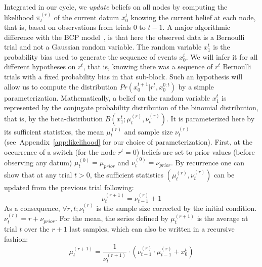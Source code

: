 \documentclass[12pt,english]{article}%
\newcommand{\eql}[1]{\begin{equation}#1\end{equation}}
\newcommand{\citep}[1]{\parencite{#1}}
\newcommand{\seeFig}[1]{Figure~\ref{fig:#1}}
\newcommand{\seeEq}[1]{Equation~\ref{eq:#1}}
\newcommand{\seeApp}[1]{Appendix~\ref{app:#1}}
\begin{document}
Integrated in our cycle, we \emph{update} beliefs on all nodes
by computing the likelihood $\pi^{(r)}_t$ of the current datum $x_0^{t}$
knowing the current belief at each node,
that is, based on observations from trials $0$ to $t-1$. %
A major algorithmic difference with the BCP model~\citep{AdamsMackay2007},
is that here the observed data is a Bernoulli trial and not a Gaussian random variable.
The random variable $x_1^t$ is the probability bias used
to generate the sequence of events $x_0^t$.
We will infer it for all different hypotheses on $r^t$,
that is, knowing there was a sequence of $r^t$ Bernoulli trials 
with a fixed probability bias in that sub-block.
Such an hypothesis will allow us to compute the distribution
$Pr(x_0^{t+1} | r^{t}, x_0^{0:t})$
by a simple parameterization.
Mathematically, a belief on the random variable $x_1^t$ is represented
by the conjugate probability distribution of the binomial distribution,
that is, by the beta-distribution $B(x_1^t; \mu^{(r)}_{t}, \nu^{(r)}_{t})$.
It is parameterized here by its sufficient statistics,
the mean $\mu^{(r)}_{t}$ and sample size $\nu^{(r)}_{t}$ %
(see~\seeApp{likelihood} for our choice of parameterization).
First, at the occurrence of a switch (for the node $r^t=0$)
beliefs are set to prior values (before observing any datum)
$\mu^{(0)}_{t} = \mu_{prior}$ and $\nu^{(0)}_{t} = \nu_{prior}$.
By recurrence %
one can show that at any trial $t>0$,
the sufficient statistics $(\mu^{(r)}_{t}, \nu^{(r)}_{t})$
can be updated from the previous trial following:
\eql{
\nu^{(r+1)}_{t} = \nu^{(r)}_{t-1} + 1 
\label{eq:update_nu}
}
As a consequence, $\forall r, t; \nu^{(r)}_{t}$ is the sample size corrected by the initial condition.
$\nu^{(r)}_{t} = r + \nu_{prior}$. For the mean, the series defined by $\mu^{(r+1)}_{t}$ is the average at trial $t$ over the $r+1$ last samples, which can also be written in a recursive fashion:
\eql{
\mu^{(r+1)}_{t} = \frac{1}{\nu^{(r+1)}_{t}} \cdot (\nu^{(r)}_{t-1} \cdot \mu^{(r)}_{t-1} +  x_0^{t})
\label{eq:update_mu}
}
\end{document}
